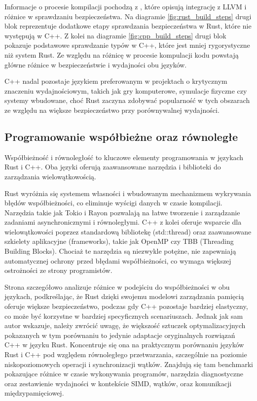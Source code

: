 Informacje o procesie kompilacji pochodzą z \cite{Lesiński, rustPolishNames, TheRustProgrammingLanguage}, które opisują integrację z LLVM i różnice w sprawdzaniu bezpieczeństwa.
Na diagramie \ref{fig:rust_build_steps} drugi blok reprezentuje dodatkowe etapy sprawdzania bezpieczeństwa w Rust, które nie występują w C++. Z kolei na diagramie \ref{fig:cpp_build_steps} drugi blok pokazuje podstawowe sprawdzanie typów w C++, które jest mniej rygorystyczne niż system Rust. Ze względu na różnicę w procesie kompulacji kodu powstają główne różnice w bezpieczeństwie i wydajności obu języków.

C++ nadal pozostaje językiem preferowanym w projektach o krytycznym znaczeniu wydajnościowym, takich jak gry komputerowe, symulacje fizyczne czy systemy wbudowane, choć Rust zaczyna zdobywać popularność w tych obszarach ze względu na większe bezpieczeństwo przy porównywalnej wydajności. 

\subsection{Programowanie współbieżne oraz równoległe}
Współbieżność i równoległość to kluczowe elementy programowania w  językach Rust i C++. Oba języki oferują zaawansowane narzędzia i biblioteki do zarządzania wielowątkowością.

Rust wyróżnia się systemem własności  i wbudowanym mechanizmem wykrywania błędów współbieżności, co eliminuje wyścigi danych w czasie kompilacji. Narzędzia takie jak Tokio i Rayon pozwalają na łatwe tworzenie i zarządzanie zadaniami asynchronicznymi i równoległymi.
C++ z kolei oferuje wsparcie dla wielowątkowości poprzez standardową bibliotekę (std::thread) oraz zaawansowane szkielety aplikacyjne (frameworks), takie jak OpenMP czy TBB (Threading Building Blocks). Chociaż te narzędzia są niezwykle potężne, nie zapewniają automatycznej ochrony przed błędami współbieżności, co wymaga większej ostrożności ze strony programistów.

Strona \cite{parallelrustcppIntroductionComparing} szczegółowo analizuje różnice w podejściu do współbieżności w obu językach, podkreślając, że Rust dzięki swojemu modelowi zarządzania pamięcią oferuje większe bezpieczeństwo, podczas gdy C++ pozostaje bardziej elastyczny, co może być korzystne w bardziej specyficznych scenariuszach. Jednak jak sam autor \cite{parallelrustcppIntroductionComparing} wskazuje, należy zwrócić uwagę, że większość sztuczek optymalizacyjnych pokazanych w tym porównaniu to jedynie adaptacje oryginalnych rozwiązań C++ w języku Rust. Koncentruje się ona na praktycznym porównaniu języków Rust i C++ pod względem równoległego przetwarzania, szczególnie na poziomie niskopoziomowych operacji i synchronizacji wątków. Znajdują się tam benchmarki pokazujące różnice w czasie wykonywania programów, narzędzia diagnostyczne oraz zestawienie wydajności w kontekście SIMD, wątków, oraz komunikacji międzypamięciowej.


